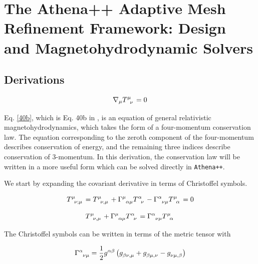 \documentclass[onecolumn]{aastex63}
\begin{document}
\section{The Athena++ Adaptive Mesh Refinement Framework: Design and Magnetohydrodynamic Solvers}

\begin{centering}

\cite{stone2020}

\end{centering} 

\subsection{Derivations}

\begin{equation} \label{40b} 
    \nabla_\mu T\indices{^\mu_\nu} = 0
\end{equation}

Eq. \ref{40b}, which is Eq. 40b in \cite{stone2020}, is an equation of general relativistic magnetohydrodynamics, which takes the form of a four-momentum conservation law. The equation corresponding to the zeroth component of the four-momentum describes conservation of energy, and the remaining three indices describe conservation of 3-momentum. In this derivation, the conservation law will be written in a more useful form which can be solved directly in \texttt{Athena++}.

We start by expanding the covariant derivative in terms of Christoffel symbols.

\begin{equation}
    T\indices{^\mu_{\nu ; \mu}} =  T\indices{^\mu_{\nu , \mu}} + \Gamma \indices{^\mu _{\alpha \mu}} T\indices{^\alpha _\nu} - \Gamma \indices{^\alpha _{\nu \mu}} T\indices{^\mu _\alpha} = 0
\end{equation}

\begin{equation} \label{carriedover}
    T\indices{^\mu_{\nu , \mu}} + \Gamma \indices{^\mu _{\alpha \mu}} T\indices{^\alpha _\nu} = \Gamma \indices{^\alpha _{\nu \mu}} T\indices{^\mu _\alpha}
\end{equation}

The Christoffel symbols can be written in terms of the metric tensor with

\begin{equation} \label{metric_expand}
    \Gamma \indices{^\alpha _{\nu \mu}} = \frac{1}{2}g\indices{^{\alpha \beta}} \left( g\indices{_{\beta \nu , \mu}} + g\indices{_{\beta \mu , \nu}} - g\indices{_{\nu \mu, \beta}} \right)
\end{equation}
\end{document}
